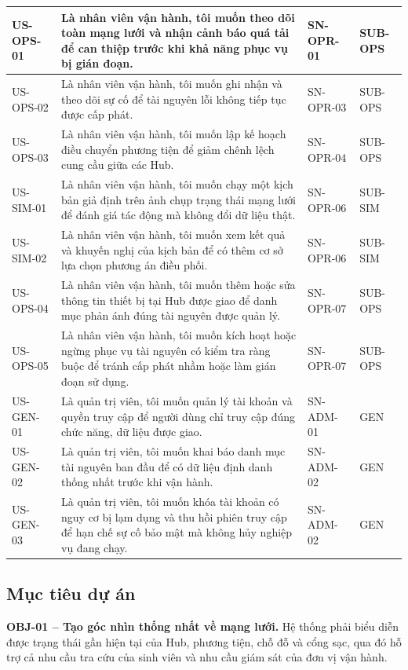 \begin{longtable}{|L{22mm}|L{72mm}|L{23mm}|L{20mm}|}
  \hline
  US-OPS-01 & Là nhân viên vận hành, tôi muốn theo dõi toàn mạng lưới và nhận cảnh báo quá tải để can thiệp trước khi khả năng phục vụ bị gián đoạn. & SN-OPR-01 & SUB-OPS\\
  \hline
  US-OPS-02 & Là nhân viên vận hành, tôi muốn ghi nhận và theo dõi sự cố để tài nguyên lỗi không tiếp tục được cấp phát. & SN-OPR-03 & SUB-OPS\\
  \hline
  US-OPS-03 & Là nhân viên vận hành, tôi muốn lập kế hoạch điều chuyển phương tiện để giảm chênh lệch cung cầu giữa các Hub. & SN-OPR-04 & SUB-OPS\\
  \hline
  US-SIM-01 & Là nhân viên vận hành, tôi muốn chạy một kịch bản giả định trên ảnh chụp trạng thái mạng lưới để đánh giá tác động mà không đổi dữ liệu thật. & SN-OPR-06 & SUB-SIM\\
  \hline
  US-SIM-02 & Là nhân viên vận hành, tôi muốn xem kết quả và khuyến nghị của kịch bản để có thêm cơ sở lựa chọn phương án điều phối. & SN-OPR-06 & SUB-SIM\\
  \hline
  US-OPS-04 & Là nhân viên vận hành, tôi muốn thêm hoặc sửa thông tin thiết bị tại Hub được giao để danh mục phản ánh đúng tài nguyên được quản lý. & SN-OPR-07 & SUB-OPS\\
  \hline
  US-OPS-05 & Là nhân viên vận hành, tôi muốn kích hoạt hoặc ngừng phục vụ tài nguyên có kiểm tra ràng buộc để tránh cấp phát nhầm hoặc làm gián đoạn sử dụng. & SN-OPR-07 & SUB-OPS\\
  \hline
  US-GEN-01 & Là quản trị viên, tôi muốn quản lý tài khoản và quyền truy cập để người dùng chỉ truy cập đúng chức năng, dữ liệu được giao. & SN-ADM-01 & GEN\\
  \hline
  US-GEN-02 & Là quản trị viên, tôi muốn khai báo danh mục tài nguyên ban đầu để có dữ liệu định danh thống nhất trước khi vận hành. & SN-ADM-02 & GEN\\
  \hline
  US-GEN-03 & Là quản trị viên, tôi muốn khóa tài khoản có nguy cơ bị lạm dụng và thu hồi phiên truy cập để hạn chế sự cố bảo mật mà không hủy nghiệp vụ đang chạy. & SN-ADM-02 & GEN\\
  \hline
\end{longtable}
\endgroup

\subsection{Mục tiêu dự án}

\noindent\textbf{OBJ-01 -- Tạo góc nhìn thống nhất về mạng lưới.}
Hệ thống phải biểu diễn được trạng thái gần hiện tại của Hub, phương tiện, chỗ đỗ và cổng sạc, qua đó hỗ trợ cả nhu cầu tra cứu của sinh viên và nhu cầu giám sát của đơn vị vận hành.

